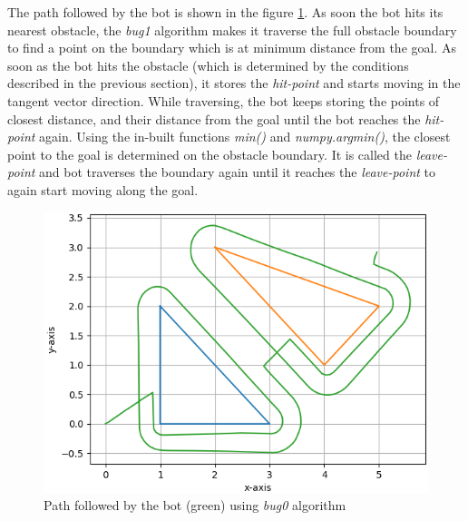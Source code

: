 \documentclass[a4paper, 11pt, letterpaper]{article}
\begin{document}
The path followed by the bot is shown in the figure \ref{fig:bug1}. As soon the bot hits its nearest obstacle, the \textit{bug1} algorithm makes it traverse the full obstacle boundary to find a point on the boundary which is at minimum distance from the goal. As soon as the bot hits the obstacle (which is determined by the conditions described in the previous section), it stores the \textit{hit-point} and starts moving in the tangent vector direction. While traversing, the bot keeps storing the points of closest distance, and their distance from the goal until the bot reaches the \textit{hit-point} again. Using the in-built functions \textit{min()} and \textit{numpy.argmin()}, the closest point to the goal is determined on the obstacle boundary. It is called the \textit{leave-point} and bot traverses the boundary again until it reaches the \textit{leave-point} to again start moving along the goal.

\begin{figure}[tbhp!]
	\centering
	\includegraphics[scale = 0.5]{plots/bug1Path.png}
	\caption{\footnotesize{Path followed by the bot (green) using \textit{bug0} algorithm}}
	\label{fig:bug1}
\end{figure}
\end{document}
